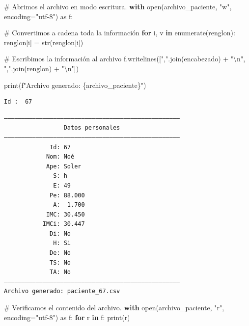 \documentclass[
  spanish,
  letterpaper,
]{scrbook}
\newenvironment{Shaded}{\begin{snugshade}}{\end{snugshade}}
\newcommand{\BuiltInTok}[1]{\textcolor[rgb]{0.00,0.23,0.31}{#1}}
\newcommand{\CharTok}[1]{\textcolor[rgb]{0.13,0.47,0.30}{#1}}
\newcommand{\CommentTok}[1]{\textcolor[rgb]{0.37,0.37,0.37}{#1}}
\newcommand{\ControlFlowTok}[1]{\textcolor[rgb]{0.00,0.23,0.31}{\textbf{#1}}}
\newcommand{\ImportTok}[1]{\textcolor[rgb]{0.00,0.46,0.62}{#1}}
\newcommand{\KeywordTok}[1]{\textcolor[rgb]{0.00,0.23,0.31}{\textbf{#1}}}
\newcommand{\NormalTok}[1]{\textcolor[rgb]{0.00,0.23,0.31}{#1}}
\newcommand{\OperatorTok}[1]{\textcolor[rgb]{0.37,0.37,0.37}{#1}}
\newcommand{\SpecialCharTok}[1]{\textcolor[rgb]{0.37,0.37,0.37}{#1}}
\newcommand{\SpecialStringTok}[1]{\textcolor[rgb]{0.13,0.47,0.30}{#1}}
\newcommand{\StringTok}[1]{\textcolor[rgb]{0.13,0.47,0.30}{#1}}
\theoremstyle{definition}
\theoremstyle{remark}
\begin{document}
\begin{Shaded}
\begin{Highlighting}[]
\CommentTok{\# Abrimos el archivo en modo escritura.}
\ControlFlowTok{with} \BuiltInTok{open}\NormalTok{(archivo\_paciente, }\StringTok{"w"}\NormalTok{, encoding}\OperatorTok{=}\StringTok{"utf{-}8"}\NormalTok{) }\ImportTok{as}\NormalTok{ f:}

    \CommentTok{\# Convertimos a cadena toda la información}
    \ControlFlowTok{for}\NormalTok{ i, v }\KeywordTok{in} \BuiltInTok{enumerate}\NormalTok{(renglon):}
\NormalTok{        renglon[i] }\OperatorTok{=} \BuiltInTok{str}\NormalTok{(renglon[i])}

    \CommentTok{\# Escribimos la información al archivo}
\NormalTok{    f.writelines([}\StringTok{","}\NormalTok{.join(encabezado) }\OperatorTok{+} \StringTok{"}\CharTok{\textbackslash{}n}\StringTok{"}\NormalTok{,}
                  \StringTok{","}\NormalTok{.join(renglon) }\OperatorTok{+} \StringTok{"}\CharTok{\textbackslash{}n}\StringTok{"}\NormalTok{])}

\BuiltInTok{print}\NormalTok{(}\SpecialStringTok{f"Archivo generado: }\SpecialCharTok{\{}\NormalTok{archivo\_paciente}\SpecialCharTok{\}}\SpecialStringTok{"}\NormalTok{)}
\end{Highlighting}
\end{Shaded}

\begin{verbatim}
Id :  67
\end{verbatim}

\begin{verbatim}
――――――――――――――――――――――――――――――――――――――――――――――――――
                 Datos personales                 
――――――――――――――――――――――――――――――――――――――――――――――――――
             Id: 67
            Nom: Noé
            Ape: Soler
              S: h
              E: 49
             Pe: 88.000
              A:  1.700
            IMC: 30.450
           IMCi: 30.447
             Di: No
              H: Si
             De: No
             TS: No
             TA: No
――――――――――――――――――――――――――――――――――――――――――――――――――
Archivo generado: paciente_67.csv
\end{verbatim}

\begin{Shaded}
\begin{Highlighting}[]
\CommentTok{\# Verificamos el contenido del archivo.}
\ControlFlowTok{with} \BuiltInTok{open}\NormalTok{(archivo\_paciente, }\StringTok{"r"}\NormalTok{, encoding}\OperatorTok{=}\StringTok{"utf{-}8"}\NormalTok{) }\ImportTok{as}\NormalTok{ f:}
    \ControlFlowTok{for}\NormalTok{ r }\KeywordTok{in}\NormalTok{ f:}
        \BuiltInTok{print}\NormalTok{(r)}
\end{Highlighting}
\end{Shaded}
\end{document}
